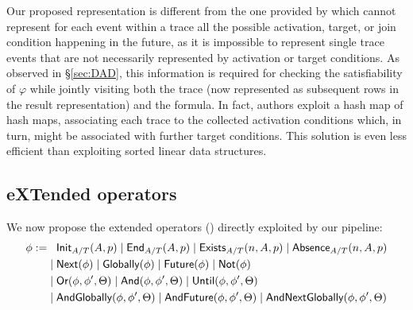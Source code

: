 Our proposed representation is different from the one provided by \cite{BurattinMS16} which cannot represent for each event within a trace all the possible activation, target, or join condition happening in the future, as it is impossible to represent single trace events that are not necessarily represented by activation or target conditions. As observed in \S\ref{sec:DAD}, this information is required for checking the satisfiability of $\varphi$ while jointly visiting both the trace (now represented as subsequent rows in the result representation) and the formula. 
In fact, authors exploit
a hash map of hash maps, associating  each trace to the collected activation conditions which, in turn, might be associated with further target conditions. 
This solution is even less efficient than exploiting sorted linear data structures.



\subsection{eXTended \LTLf operators}\label{sec:xltlf}

We now propose the extended \LTLf operators (\xLTLf) directly exploited by our pipeline:
\[\begin{split}
\phi:=&\;\;\;\textsf{Init}_{A/T}(A,p)\;|\;\textsf{End}_{A/T}(A,p)\;|\;\textsf{Exists}_{A/T}(n,A,p)\;|\;\textsf{Absence}_{A/T}(n,A,p)\\
     &\;|\; \textsf{Next}(\phi)\;|\; \textsf{Globally}(\phi)\;|\; \textsf{Future}(\phi)\;|\; \textsf{Not}(\phi)\\
     &\;|\; \textsf{Or}(\phi,\phi',\Theta)\;|\; \textsf{And}(\phi,\phi',\Theta)\;|\; \textsf{Until}(\phi,\phi',\Theta)\\
     &\;|\; \textsf{AndGlobally}(\phi,\phi',\Theta)\;|\; \textsf{AndFuture}(\phi,\phi',\Theta)\;|\; \textsf{AndNextGlobally}(\phi,\phi',\Theta)\\
\end{split}\]

